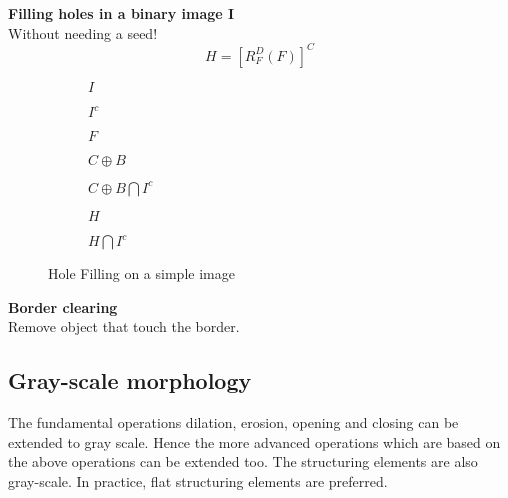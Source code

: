 \textbf{Filling holes in a binary image I}\\
Without needing a seed!\\
\[
	H = [R_F^D(F)]^C
\]
\begin{figure}[h!]
\centering
\begin{subfigure}[b]{0.13\textwidth}
\centering
{}
\caption{$I$}
\end{subfigure}
\begin{subfigure}[b]{0.13\textwidth}
\centering
{}
\caption{$I^c$}
\end{subfigure}
\begin{subfigure}[b]{0.13\textwidth}
\centering
{}
\caption{$F$}
\end{subfigure}
\begin{subfigure}[b]{0.13\textwidth}
\centering
{}
\caption{$C \oplus B$}
\end{subfigure}
\begin{subfigure}[b]{0.13\textwidth}
\centering
{}
\caption{$C \oplus B \bigcap I^c$}
\end{subfigure}
\begin{subfigure}[b]{0.13\textwidth}
\centering
{}
\caption{$H$}
\end{subfigure}
\begin{subfigure}[b]{0.13\textwidth}
\centering
{}
\caption{$H \bigcap I^c$}
\end{subfigure}
\caption{Hole Filling on a simple image}
\end{figure}

\textbf{Border clearing}\\
Remove object that touch the border.

\subsection{Gray-scale morphology}
The fundamental operations dilation, erosion, opening and closing can be extended to gray scale. Hence the more advanced operations which are based on the above operations can be extended too. The structuring elements are also gray-scale. In practice, flat structuring elements are preferred.

